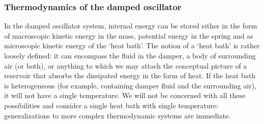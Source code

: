 \subsubsection{Thermodynamics of the damped oscillator}
In the damped oscillator system, internal energy can be stored either in the form of macroscopic kinetic energy in the mass, potential energy in the spring and as microscopic kinetic energy of the `heat bath'. The notion of a `heat bath' is rather loosely defined: it can encompass the fluid in the damper, a body of surrounding air (or both), or anything to which we may attach the conceptual picture of a reservoir that absorbs the dissipated energy in the form of heat. If the heat bath is heterogeneous (for example, containing damper fluid and the surrounding air), it will not have a single temperature. We will not be concerned with all these possibilities and consider a single heat bath with single temperature: generalizations to more complex thermodynamic systems are immediate.

